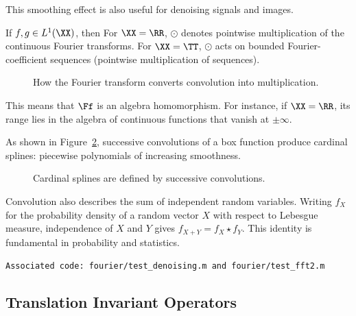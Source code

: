 This smoothing effect is also useful for denoising signals and images.



   
\begin{prop}
If $f,g\in L^1(\XX)$, then
For $\XX=\RR$, $\odot$ denotes pointwise multiplication of the continuous Fourier transforms.
For $\XX=\TT$, $\odot$ acts on bounded Fourier-coefficient sequences (pointwise multiplication of sequences).
\end{prop}


           
\begin{figure}[tbp]
\centering
{}
\caption{How the Fourier transform converts convolution into multiplication.}
\label{fig-review-fourier-convolution-fourier}
\end{figure}
This means that $\Ff$ is an algebra homomorphism. For instance, if $\XX=\RR$, its range lies in the algebra of continuous functions that vanish at $\pm\infty$.

As shown in Figure~\ref{fig-splines}, successive convolutions of a box function produce cardinal splines: piecewise polynomials of increasing smoothness.

\begin{figure}[tbp]
\centering
{}
\caption{Cardinal splines are defined by successive convolutions.}
\label{fig-splines}
\end{figure}


Convolution also describes the sum of independent random variables. Writing $f_X$ for the probability density of a random vector $X$ with respect to Lebesgue measure, independence of $X$ and $Y$ gives $f_{X+Y}=f_X \star f_Y$. This identity is fundamental in probability and statistics.


\texttt{Associated code: fourier/test\_denoising.m and fourier/test\_fft2.m}

                                                
\subsection{Translation Invariant Operators}

